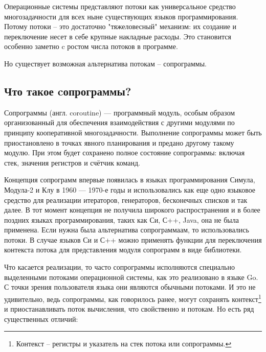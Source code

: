 	\par
	Операционные системы представляют потоки как универсальное средство многозадачности
	для всех ныне существующих языков программирования. Потому потоки 
	-- это достаточно "тяжеловесный" механизм: их создание и переключение несет в себе крупные накладные расходы. 
	Это становится особенно заметно c ростом числа потоков в программе. 
	\par
	Но существует возможная альтернатива потокам -- сопрограммы.
	\clearpage
	
	\subsection{Что такое cопрограммы?}
	Сопрограммы (англ. coroutine) — программный модуль, особым образом организованный для обеспечения взаимодействия с другими модулями по принципу кооперативной многозадачности\cite{coroutine}. Выполнение сопрограммы может быть
	приостановлено в точках явного планирования и предано другому такому модулю. При этом будет сохранено полное
	состояние сопрограммы: включая стек, значения регистров и счётчик команд.
	\par
	Концепция сопрограмм впервые появилась в языках программирования Симула\cite{simula},
	Модула-2\cite{modula} и Клу\cite{clu} в 1960 — 1970-е годы и использовались как еще одно языковое средство для
	реализации итераторов, генераторов, бесконечных списков и так далее. В
	тот момент концепция не получила широкого распространения и в более поздних языках
	программирования, таких как Си, С++, Java, она не была применена. Если нужна была
	альтернатива сопрограммаам, то использовались потоки. В случае языков Си и С++ можно применять функции для
	переключения контекста потока для представления модуля сопрограмм в виде библиотеки.
	\par
	Что касается реализации, то часто сопрограммы исполняются специально выделенными потоками операционной системы,
	как это реализовано в языке Go. С точки зрения пользователя языка они являются обычными потоками.
	И это не удивительно, ведь сопрограммы, как говорилось ранее, могут сохранять контекст\footnote{Контекст -- регистры и указатель на стек потока или сопрограммы.} и приостанавливать поток вычисления, что свойственно и потокам. Но есть ряд существенных отличий:
